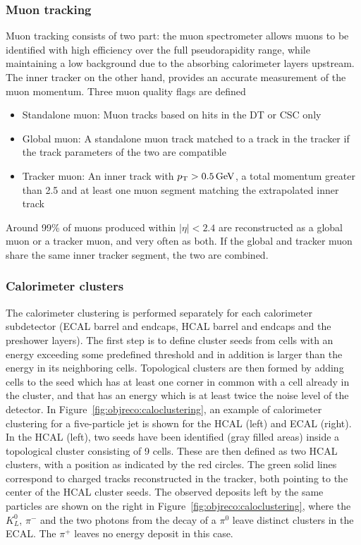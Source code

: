 \subsubsection{Muon tracking}
\label{subsub:objreco:muontracking}
Muon tracking consists of two part: the muon spectrometer allows muons to be identified with high efficiency over the full pseudorapidity range, while maintaining a low background due to the absorbing calorimeter layers upstream. The inner tracker on the other hand, provides an accurate measurement of the muon momentum. Three muon quality flags are defined
\begin{itemize}
  \item Standalone muon: Muon tracks based on hits in the DT or CSC only
  \item Global muon: A standalone muon track matched to a track in the tracker if the track parameters of the two are compatible
  \item Tracker muon: An inner track with $p_{\mathrm{T}}> 0.5 \,\text{Ge\hspace{-.08em}V}$, a total momentum greater than 2.5 \GeV and at least one muon segment matching the extrapolated inner track
\end{itemize}
Around 99\% of muons produced within $|\eta|<2.4$ are reconstructed as a global muon or a tracker muon, and very often as both. If the global and tracker muon share the same inner tracker segment, the two are combined.

\subsubsection{Calorimeter clusters}
 The calorimeter clustering is performed separately for each calorimeter subdetector (ECAL barrel and endcaps, HCAL barrel and endcaps and the preshower layers).
The first step is to define cluster seeds from cells with an energy exceeding some predefined threshold and in addition is larger than the energy in its neighboring cells. Topological clusters are then formed by adding cells to the seed which has at least one corner in common with a cell already in the cluster, and that has an energy which is at least twice the noise level of the detector. In Figure~\ref{fig:objreco:caloclustering}, an example of calorimeter clustering for a five-particle jet is shown for the HCAL (left) and ECAL (right). In the HCAL (left), two seeds have been identified (gray filled areas) inside a topological cluster consisting of 9 cells. These are then defined as two HCAL clusters, with a position as indicated by the red circles. The green solid lines correspond to charged tracks reconstructed in the tracker, both pointing to the center of the HCAL cluster seeds. The observed deposits left by the same particles are shown on the right in Figure~\ref{fig:objreco:caloclustering}, where the $K^0_L$, $\pi^-$ and the two photons from the decay of a $\pi^0$ leave distinct clusters in the ECAL. The $\pi^+$ leaves no energy deposit in this case. 


